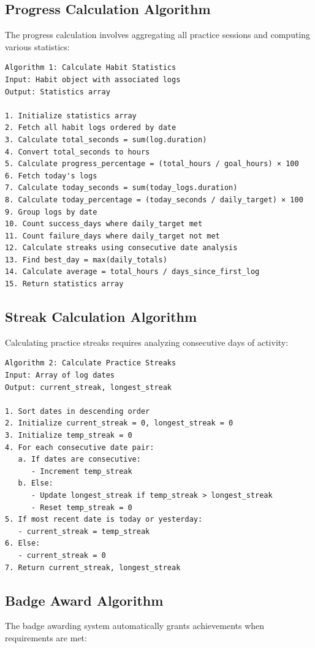 \documentclass[12pt,a4paper]{report}
\newcommand{\JustifiedNormal}{\fontsize{12}{14}\selectfont\justifying\setlength{\parindent}{0pt}}
\begin{document}
\subsection{Progress Calculation Algorithm}
\JustifiedNormal
The progress calculation involves aggregating all practice sessions and computing various statistics:

\begin{verbatim}
Algorithm 1: Calculate Habit Statistics
Input: Habit object with associated logs
Output: Statistics array

1. Initialize statistics array
2. Fetch all habit logs ordered by date
3. Calculate total_seconds = sum(log.duration)
4. Convert total_seconds to hours
5. Calculate progress_percentage = (total_hours / goal_hours) × 100
6. Fetch today's logs
7. Calculate today_seconds = sum(today_logs.duration)
8. Calculate today_percentage = (today_seconds / daily_target) × 100
9. Group logs by date
10. Count success_days where daily_target met
11. Count failure_days where daily_target not met
12. Calculate streaks using consecutive date analysis
13. Find best_day = max(daily_totals)
14. Calculate average = total_hours / days_since_first_log
15. Return statistics array
\end{verbatim}

\subsection{Streak Calculation Algorithm}
\JustifiedNormal
Calculating practice streaks requires analyzing consecutive days of activity:

\begin{verbatim}
Algorithm 2: Calculate Practice Streaks
Input: Array of log dates
Output: current_streak, longest_streak

1. Sort dates in descending order
2. Initialize current_streak = 0, longest_streak = 0
3. Initialize temp_streak = 0
4. For each consecutive date pair:
   a. If dates are consecutive:
      - Increment temp_streak
   b. Else:
      - Update longest_streak if temp_streak > longest_streak
      - Reset temp_streak = 0
5. If most recent date is today or yesterday:
   - current_streak = temp_streak
6. Else:
   - current_streak = 0
7. Return current_streak, longest_streak
\end{verbatim}

\subsection{Badge Award Algorithm}
\JustifiedNormal
The badge awarding system automatically grants achievements when requirements are met:
\end{document}
